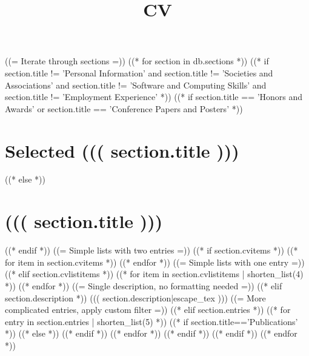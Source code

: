 \documentclass[10pt,a4paper,sans]{moderncv}
\title{CV}
\begin{document}
  \makecvtitle
  ((= Iterate through sections =))
  ((* for section in db.sections *))
  ((* if section.title != 'Personal Information' and section.title != 'Societies and Associations' and section.title != 'Software and Computing Skills' and section.title != 'Employment Experience' *))
  ((* if section.title == 'Honors and Awards' or section.title == 'Conference Papers and Posters' *))
  \section{Selected ((( section.title )))}
  ((* else *))
  \section{((( section.title )))}
  ((* endif *))
  ((= Simple lists with two entries =))
  ((* if section.cvitems *))
  ((* for item in section.cvitems *))
  ((* endfor *))
  ((= Simple lists with one entry =))
  ((* elif section.cvlistitems *))
  ((* for item in section.cvlistitems | shorten_list(4) *))
  ((* endfor *))
  ((= Single description, no formatting needed =))
  ((* elif section.description *))
  ((( section.description|escape_tex )))
  ((= More complicated entries, apply custom filter =))
  ((* elif section.entries *))
  ((* for entry in section.entries | shorten_list(5) *))
  ((* if section.title=='Publications' *))
  ((* else *))
  ((* endif *))
  ((* endfor *))
  ((* endif *))
  ((* endif *))
  ((* endfor *))
\end{document}

